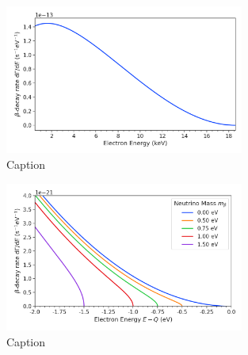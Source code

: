 \begin{figure}[htbp]
    \centering
    \includegraphics[width=0.7\textwidth]{figs/Chapter-2/230302_atomic_tritium_spectrum.png}
    \caption{Caption}
    \label{fig:atomic_tritium_spectrum}
\end{figure}

\begin{figure}[htbp]
    \centering
    \includegraphics[width=0.7\textwidth]{figs/Chapter-2/230302_atomic_tritium_spectrum_near_endpoint.png}
    \caption{Caption}
    \label{fig:atomic_tritium_endpoint}
\end{figure}

